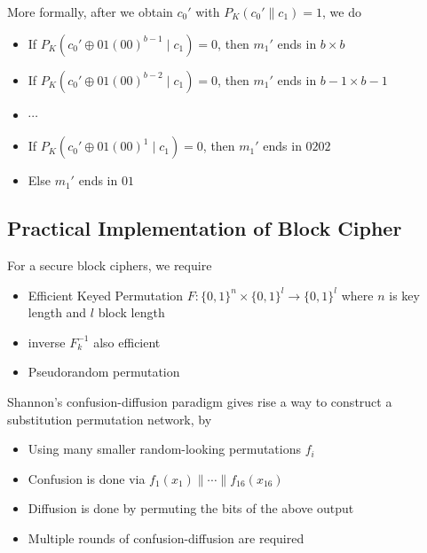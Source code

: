 \documentclass[12pt]{article}
\theoremstyle{definition}
\begin{document}
More formally, after we obtain $c_0'$ with $P_K(c_0'\|c_1)=1$, we do
\begin{itemize}
  \item If $P_K(c_0'\oplus 01(00)^{b-1}\mid c_1)=0$, then $m_1'$ ends in $b\times b$
  \item If $P_K(c_0'\oplus 01(00)^{b-2}\mid c_1)=0$, then $m_1'$ ends in $b-1\times b-1$
  \item $\cdots$
  \item If $P_K(c_0'\oplus 01(00)^{1}\mid c_1)=0$, then $m_1'$ ends in $0202$
  \item Else $m_1'$ ends in $01$
\end{itemize}
\subsection{Practical Implementation of Block Cipher}
For a secure block ciphers, we require
\begin{itemize}
  \item Efficient Keyed Permutation $F:\{0,1\}^n\times \{0,1\}^l\to \{0,1\}^l$ where $n$ is key length and $l$ block length
  \item inverse $F_k^{-1}$ also efficient
  \item Pseudorandom permutation
\end{itemize}
Shannon's confusion-diffusion paradigm gives rise a way to construct a substitution permutation network, by
\begin{itemize}
  \item Using many smaller random-looking permutations $f_i$
  \item Confusion is done via $f_1(x_1)\|\cdots\|f_{16}(x_{16})$
  \item Diffusion is done by permuting the bits of the above output
  \item Multiple rounds of confusion-diffusion are required
\end{itemize}
\end{document}
